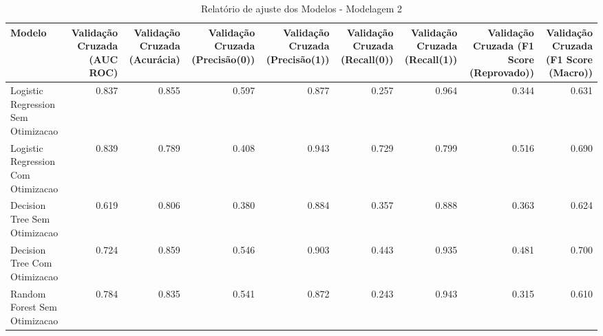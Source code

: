 \begin{table}[H] %
    \centering
    \caption{Relatório de ajuste dos Modelos - Modelagem 2}
    \label{tab:relatorio_ajuste_modelagem_2}
    \renewcommand{\arraystretch}{1.25} %
    \begin{adjustwidth}{ -1in }{ -1in } %
    \centering %
    \small %
    \begin{tabular}{lrrrrrrrr}
\toprule
                            Modelo &  Validação Cruzada (AUC ROC) &  Validação Cruzada (Acurácia) &  Validação Cruzada (Precisão(0)) &  Validação Cruzada (Precisão(1)) &  Validação Cruzada (Recall(0)) &  Validação Cruzada (Recall(1)) &  Validação Cruzada (F1 Score (Reprovado)) &  Validação Cruzada (F1 Score (Macro)) \\
\midrule
Logistic Regression Sem Otimizacao &                        0.837 &                         0.855 &                            0.597 &                            0.877 &                          0.257 &                          0.964 &                                     0.344 &                                 0.631 \\
Logistic Regression Com Otimizacao &                        0.839 &                         0.789 &                            0.408 &                            0.943 &                          0.729 &                          0.799 &                                     0.516 &                                 0.690 \\
      Decision Tree Sem Otimizacao &                        0.619 &                         0.806 &                            0.380 &                            0.884 &                          0.357 &                          0.888 &                                     0.363 &                                 0.624 \\
      Decision Tree Com Otimizacao &                        0.724 &                         0.859 &                            0.546 &                            0.903 &                          0.443 &                          0.935 &                                     0.481 &                                 0.700 \\
      Random Forest Sem Otimizacao &                        0.784 &                         0.835 &                            0.541 &                            0.872 &                          0.243 &                          0.943 &                                     0.315 &                                 0.610 \\

\end{tabular}
\end{adjustwidth}
\end{table}

